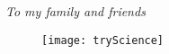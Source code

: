 \chapter*{}
\begin{center}
{\centering \textit{To my family and friends}}
\vspace{2 cm}
\begin{figure}[h]
\centering
\texttt{[image: tryScience]}
\end{figure}
\end{center} 


